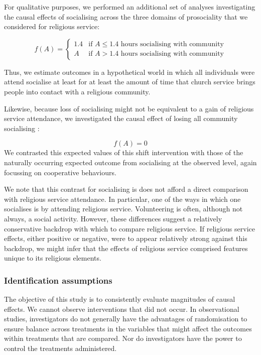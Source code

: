 \documentclass[
  singlecolumn]{article}
\begin{document}
For qualitative purposes, we performed an additional set of analyses
investigating the causal effects of socialising across the three domains
of prosociality that we considered for religious service:

\[f(A) = \begin{cases} 1.4 & \text{if } A \leq 1.4 \text{ hours socialising with community} \\ A & \text{if } A >  1.4  \text{ hours socialising with community}  \end{cases} \]

Thus, we estimate outcomes in a hypothetical world in which all
individuals were attend socialise at least for at least the amount of
time that church service brings people into contact with a religious
community.

Likewise, because loss of socialising might not be equivalent to a gain
of religious service attendance, we investigated the causal effect of
losing all community socialising :

\[f(A) = 0 \] We contrasted this expected values of this shift
intervention with those of the naturally occurring expected outcome from
socialising at the observed level, again focussing on cooperative
behaviours.

We note that this contrast for socialising is does not afford a direct
comparison with religious service attendance. In particular, one of the
ways in which one socialises is by attending religious service.
Volunteering is often, although not always, a social activity. However,
these differences suggest a relatively conservative backdrop with which
to compare religious service. If religious service effects, either
positive or negative, were to appear relatively strong against this
backdrop, we might infer that the effects of religious service comprised
features unique to its religious elements.

\subsubsection{Identification
assumptions}\label{identification-assumptions}

The objective of this study is to consistently evaluate magnitudes of
causal effects. We cannot observe interventions that did not occur. In
observational studies, investigators do not generally have the
advantages of randomisation to ensure balance across treatments in the
variables that might affect the outcomes within treatments that are
compared. Nor do investigators have the power to control the treatments
administered.
\end{document}
